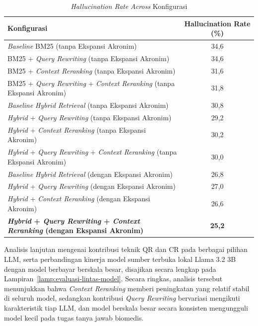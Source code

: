 \begin{table}[H]
\centering
\small
\setlength{\tabcolsep}{5pt}
\caption{\textit{Hallucination Rate} \textit{Across} Konfigurasi}
\label{tbl:halusinasi-rate}
\begin{tabular}{p{10.5cm}c}
\toprule
\textbf{Konfigurasi} & \textbf{Hallucination Rate (\%)} \\
\midrule
\textit{Baseline} BM25 (tanpa Ekspansi Akronim)                                    & 34{,}6 \\
BM25 + \textit{Query Rewriting} (tanpa Ekspansi Akronim)                           & 34{,}6 \\
BM25 + \textit{Context Reranking} (tanpa Ekspansi Akronim)                         & 31{,}6 \\
BM25 + \textit{Query Rewriting} + \textit{Context Reranking} (tanpa Ekspansi Akronim) & 31{,}8 \\
\midrule
\textit{Baseline} \textit{Hybrid Retrieval} (tanpa Ekspansi Akronim)               & 30{,}8 \\
\textit{Hybrid} + \textit{Query Rewriting} (tanpa Ekspansi Akronim)                & 29{,}2 \\
\textit{Hybrid} + \textit{Context Reranking} (tanpa Ekspansi Akronim)              & 30{,}2 \\
\textit{Hybrid} + \textit{Query Rewriting} + \textit{Context Reranking} (tanpa Ekspansi Akronim) & 30{,}0 \\
\midrule
\textit{Baseline} \textit{Hybrid Retrieval} (dengan Ekspansi Akronim)              & 26{,}8 \\
\textit{Hybrid} + \textit{Query Rewriting} (dengan Ekspansi Akronim)               & 27{,}0 \\
\textit{Hybrid} + \textit{Context Reranking} (dengan Ekspansi Akronim)             & 26{,}6 \\
\textbf{\textit{Hybrid} + \textit{Query Rewriting} + \textit{Context Reranking} (dengan Ekspansi Akronim)} & \textbf{25{,}2} \\
\bottomrule
\end{tabular}
\end{table}

Analisis lanjutan mengenai kontribusi teknik QR dan CR pada berbagai pilihan LLM, serta perbandingan kinerja model sumber terbuka lokal Llama 3.2 3B dengan model berbayar berskala besar, disajikan secara lengkap pada Lampiran~\ref{lamp:evaluasi-lintas-model}. Secara ringkas, analisis tersebut menunjukkan bahwa \textit{Context Reranking} memberi peningkatan yang relatif stabil di seluruh model, sedangkan kontribusi \textit{Query Rewriting} bervariasi mengikuti karakteristik tiap LLM, dan model berskala besar secara konsisten mengungguli model kecil pada tugas tanya jawab biomedis.

